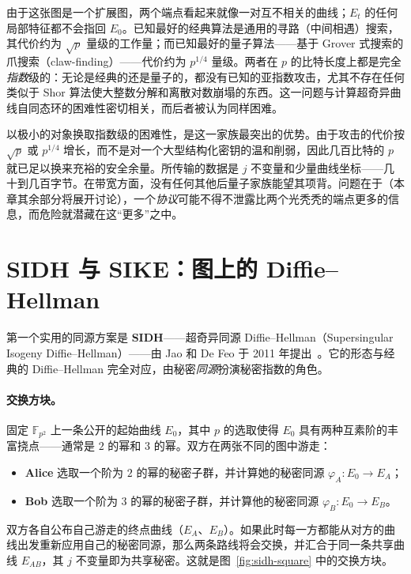 由于这张图是一个扩展图，两个端点看起来就像一对互不相关的曲线；$E_t$ 的任何局部特征都不会指回 $E_0$。已知最好的经典算法是通用的寻路（中间相遇）搜索，其代价约为 $\sqrt{p}$ 量级的工作量；而已知最好的量子算法——基于 Grover 式搜索的爪搜索（claw-finding）——代价约为 $p^{1/4}$ 量级。两者在 $p$ 的比特长度上都是完全\emph{指数}级的：无论是经典的还是量子的，都没有已知的亚指数攻击，尤其不存在任何类似于 Shor 算法使大整数分解和离散对数崩塌的东西。这一问题与计算超奇异曲线自同态环的困难性密切相关，而后者被认为同样困难。

以极小的对象换取指数级的困难性，是这一家族最突出的优势。由于攻击的代价按 $\sqrt{p}$ 或 $p^{1/4}$ 增长，而不是对一个大型结构化密钥的温和削弱，因此几百比特的 $p$ 就已足以换来充裕的安全余量。所传输的数据是 $j$ 不变量和少量曲线坐标——几十到几百字节。在带宽方面，没有任何其他后量子家族能望其项背。问题在于（本章其余部分将展开讨论），一个\emph{协议}可能不得不泄露比两个光秃秃的端点更多的信息，而危险就潜藏在这“更多”之中。

\section{SIDH 与 SIKE：图上的 Diffie--Hellman}

第一个实用的同源方案是 \textbf{SIDH}——超奇异同源 Diffie--Hellman（Supersingular Isogeny Diffie--Hellman）——由 Jao 和 De Feo 于 2011 年提出~\cite{jaodefeo2011}。它的形态与经典的 Diffie--Hellman 完全对应，由秘密\emph{同源}扮演秘密指数的角色。

\paragraph{交换方块。}
固定 $\mathbb{F}_{p^2}$ 上一条公开的起始曲线 $E_0$，其中 $p$ 的选取使得 $E_0$ 具有两种互素阶的丰富挠点——通常是 $2$ 的幂和 $3$ 的幂。双方在两张不同的图中游走：
\begin{itemize}
  \item \textbf{Alice} 选取一个阶为 $2$ 的幂的秘密子群，并计算她的秘密同源 $\varphi_A : E_0 \to E_A$；
  \item \textbf{Bob} 选取一个阶为 $3$ 的幂的秘密子群，并计算他的秘密同源 $\varphi_B : E_0 \to E_B$。
\end{itemize}
双方各自公布自己游走的终点曲线（$E_A$、$E_B$）。如果此时每一方都能从对方的曲线出发重新应用自己的秘密同源，那么两条路线将会交换，并汇合于同一条共享曲线 $E_{AB}$，其 $j$ 不变量即为共享秘密。这就是图~\ref{fig:sidh-square} 中的交换方块。

